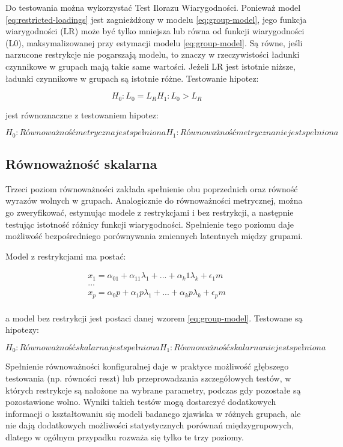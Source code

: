 \documentclass[12pt]{article}
\begin{document}
Do testowania można wykorzystać Test Ilorazu Wiarygodności. Ponieważ model \ref{eq:restricted-loadings} jest zagnieżdżony w modelu \ref{eq:group-model}, jego funkcja wiarygodności (LR) może być tylko mniejsza lub równa od funkcji wiarygodności (L0), maksymalizowanej przy estymacji modelu \ref{eq:group-model}. Są równe, jeśli narzucone restrykcje nie pogarszają modelu, to znaczy w rzeczywistości ładunki czynnikowe w grupach mają takie same wartości. Jeżeli LR jest istotnie niższe, ładunki czynnikowe w grupach są istotnie różne. Testowanie hipotez:

\[H_0: L_0 = L_R
H_1: L_0 > L_R\]

jest równoznaczne z testowaniem hipotez:

\[H_0: Równoważność metryczna jest spełniona
H_1: Równoważność metryczna nie jest spełniona\]

\hypertarget{ruxf3wnowaux17cnoux15bux107-skalarna}{%
\subsection{Równoważność skalarna}\label{ruxf3wnowaux17cnoux15bux107-skalarna}}

Trzeci poziom równoważności zakłada spełnienie obu poprzednich oraz równość wyrazów wolnych w grupach. Analogicznie do równoważności metrycznej, można go zweryfikować, estymując modele z restrykcjami i bez restrykcji, a następnie testując istotność różnicy funkcji wiarygodności. Spełnienie tego poziomu daje możliwość bezpośredniego porównywania zmiennych latentnych między grupami.

Model z restrykcjami ma postać:

\begin{equation}
\label{eq:restricted-intercepts}
\begin{aligned} 
x_1 = \alpha_01 + \alpha_11 \lambda_1 + ... + \alpha_k1 \lambda_k + \epsilon_1m\\
...\\
x_p = \alpha_0p + \alpha_1p \lambda_1 + ... + \alpha_kp \lambda_k + \epsilon_pm\\
\end{aligned}
\end{equation}

a model bez restrykcji jest postaci danej wzorem \ref{eq:group-model}. Testowane są hipotezy:

\[H_0: Równoważność skalarna jest spełniona
H_1: Równoważność skalarna nie jest spełniona\]

Spełnienie równoważności konfiguralnej daje w praktyce możliwość głębszego testowania (np. równości reszt) lub przeprowadzania szczegółowych testów, w których restrykcje są nałożone na wybrane parametry, podczas gdy pozostałe są pozostawione wolno. Wyniki takich testów mogą dostarczyć dodatkowych informacji o kształtowaniu się modeli badanego zjawiska w różnych grupach, ale nie dają dodatkowych możliwości statystycznych porównań międzygrupowych, dlatego w ogólnym przypadku rozważa się tylko te trzy poziomy.
\end{document}
